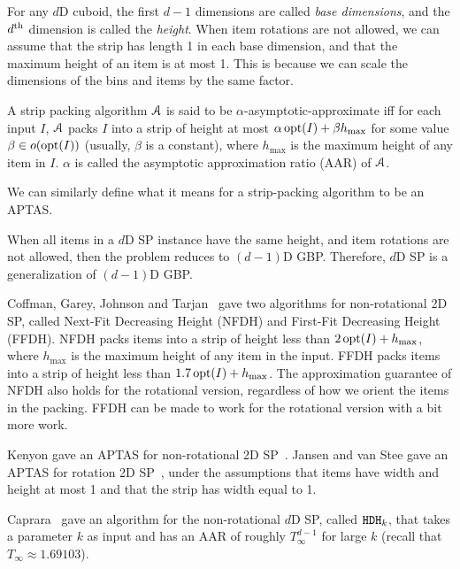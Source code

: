 For any $d$D cuboid, the first $d-1$ dimensions are called \emph{base dimensions},
and the $d^{\textrm{th}}$ dimension is called the \emph{height}.
When item rotations are not allowed, we can assume \wLoG{} that
the strip has length 1 in each base dimension, and that the
maximum height of an item is at most 1.
This is because we can scale the dimensions of the bins and items by the same factor.

\begin{definition}
A strip packing algorithm $\mathcal{A}$ is said to be
$\alpha$-asymptotic-approximate iff for each input $I$,
$\mathcal{A}$ packs $I$ into a strip of height at most
$\alpha\operatorname{opt}(I) + \beta h_{\max}$
for some value $\beta \in o(\operatorname{opt}(I))$ (usually, $\beta$ is a constant),
where $h_{\max}$ is the maximum height of any item in $I$.
$\alpha$ is called the asymptotic approximation ratio (AAR) of $\mathcal{A}$.
\end{definition}
We can similarly define what it means for a strip-packing algorithm to be an APTAS.

When all items in a $d$D SP instance have the same height,
and item rotations are not allowed, then the problem reduces to $(d-1)$D GBP.
Therefore, $d$D SP is a generalization of $(d-1)$D GBP.

Coffman, Garey, Johnson and Tarjan~\cite{coffman1980performance}
gave two algorithms for non-rotational 2D SP,
called Next-Fit Decreasing Height (NFDH) and First-Fit Decreasing Height (FFDH).
NFDH packs items into a strip of height less than $2\operatorname{opt}(I) + h_{\max}$,
where $h_{\max}$ is the maximum height of any item in the input.
FFDH packs items into a strip of height less than $1.7\operatorname{opt}(I) + h_{\max}$.
The approximation guarantee of NFDH also holds for the rotational version,
regardless of how we orient the items in the packing.
FFDH can be made to work for the rotational version with a bit more work.

Kenyon gave an APTAS for non-rotational 2D SP~\cite{kenyon1996strip}.
Jansen and van Stee gave an APTAS for rotation 2D SP~\cite{jansen2005strip},
under the assumptions that items have width and height at most 1
and that the strip has width equal to 1.

Caprara~\cite{caprara2008} gave an algorithm for the
non-rotational $d$D SP, called $\operatorname{\mathtt{HDH}}_{k}$,
that takes a parameter $k$ as input and has an AAR of roughly
$T_{\infty}^{d-1}$ for large $k$
(recall that $T_{\infty} \approx 1.69103$).

